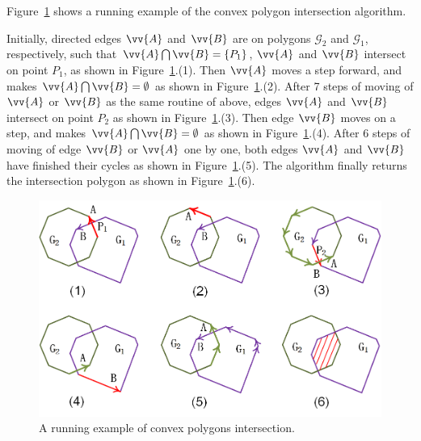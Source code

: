\begin{example}
Figure~\ref{fig:c-poly-inter} shows a running example of the convex polygon intersection algorithm.

Initially, directed edges $\vv{A}$ and $\vv{B}$ are on polygons $\mathcal{G}_2$ and $\mathcal{G}_1$, respectively, such that $\vv{A} \bigcap \vv{B} = \{P_1\}$, \ie $\vv{A}$ and $\vv{B}$ intersect on point $P_1$,  as shown in Figure~\ref{fig:c-poly-inter}.(1).
%
Then $\vv{A}$ moves  a step forward, and makes $\vv{A} \bigcap \vv{B} = \emptyset$ as shown in Figure~\ref{fig:c-poly-inter}.(2).
%
After 7 steps of moving of $\vv{A}$ or $\vv{B}$ as the same routine of above, edges $\vv{A}$ and $\vv{B}$ intersect on point $P_2$  as shown in Figure~\ref{fig:c-poly-inter}.(3).
%
Then edge $\vv{B}$ moves on a step, and makes $\vv{A} \bigcap \vv{B} = \emptyset$ as shown in Figure~\ref{fig:c-poly-inter}.(4). After 6 steps of moving of edge $\vv{B}$ or $\vv{A}$ one by one, both edges $\vv{A}$ and $\vv{B}$ have finished their cycles as shown in Figure~\ref{fig:c-poly-inter}.(5).
%
The algorithm finally returns the intersection polygon as shown in Figure~\ref{fig:c-poly-inter}.(6).
\end{example}


\begin{figure}[tb!]
\centering
\includegraphics[scale=0.88]{figures/Fig-convex-poly-inter.png}
\vspace{-1ex}
\caption{\small A running example of convex polygons intersection.}
\vspace{-2ex}
\label{fig:c-poly-inter}
\end{figure}





